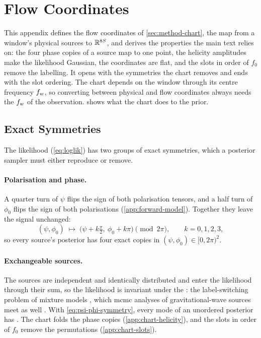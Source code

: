 \section{Flow Coordinates}
\label{app:chart}

This appendix defines the flow coordinates of \cref{sec:method-chart}, the map from a window's
physical sources to $\mathbb{R}^{8{}S}$, and derives the properties the main text relies on:
the four phase copies of a source map to one point, the helicity amplitudes make the likelihood
Gaussian, the coordinates are flat, and the slots in order of $f_0$ remove the labelling. It opens
with the symmetries the chart removes and ends with the slot ordering. The chart depends on the
window through its centre frequency $f_{w}$, so converting between physical and flow coordinates
always needs the $f_{w}$ of the observation.  shows what the chart does to the prior.

\subsection{Exact Symmetries}
\label{app:priors-symmetries}

The likelihood (\cref{eq:loglik}) has two groups of exact symmetries, which a posterior sampler
must either reproduce or remove.

\paragraph{Polarisation and phase.}
A quarter turn of $\psi$ flips the sign of both polarisation tensors, and a half turn of $\phi_0$
flips the sign of both polarisations (\cref{app:forward-model}). Together they leave the signal
unchanged:
\begin{equation}
  (\psi, \phi_0) \;\mapsto\; \bigl(\psi + k\tfrac{\pi}{2},\ \phi_0 + k\pi\bigr)
  \pmod{2\pi},\qquad k = 0,1,2,3,
  \label{eq:psi-phi-symmetry}
\end{equation}
so every source's posterior has four exact copies in $(\psi,\phi_0)\in[0,2\pi)^2$.

\paragraph{Exchangeable sources.}
The sources are independent and identically distributed and enter the likelihood through their
sum, so the likelihood is invariant under the : the
label-switching problem of mixture models \citep{stephens2000dealing,jasra2005markov}, which
\ac{mcmc} analyses of gravitational-wave sources meet as well \citep{buscicchio2019label}. With
\cref{eq:psi-phi-symmetry}, every mode of an unordered posterior has
. The
chart folds the phase copies (\cref{app:chart-helicity}), and the slots in order of $f_0$ remove
the permutations (\cref{app:chart-slots}).

